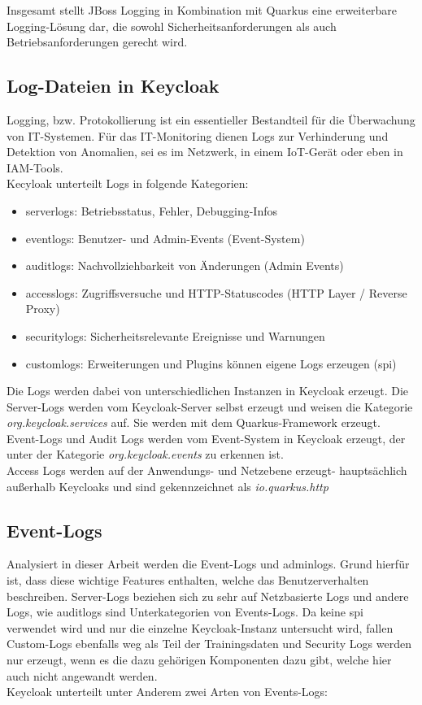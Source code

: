 \documentclass[a4paper,12pt]{article}
\begin{document}
	Insgesamt stellt JBoss Logging in Kombination mit Quarkus eine erweiterbare Logging-Lösung dar, die sowohl Sicherheitsanforderungen als auch Betriebsanforderungen gerecht wird.
	
	\subsection{Log-Dateien in Keycloak}
	Logging, bzw. Protokollierung ist ein essentieller Bestandteil für die Überwachung von IT-Systemen. Für das IT-Monitoring dienen Logs zur Verhinderung und Detektion von Anomalien, sei es im Netzwerk, in einem IoT-Gerät oder eben in IAM-Tools. 
	\\[0.5em]
	Kecyloak unterteilt Logs in folgende Kategorien:
	\begin{itemize}
		\item \gls{serverlogs}: Betriebsstatus, Fehler, Debugging-Infos
		\item \gls{eventlogs}: Benutzer- und Admin-Events (Event-System)
		\item \gls{auditlogs}: Nachvollziehbarkeit von Änderungen (Admin Events)
		\item \gls{accesslogs}: Zugriffsversuche und HTTP-Statuscodes (HTTP Layer / Reverse Proxy)
		\item \gls{securitylogs}: Sicherheitsrelevante Ereignisse und Warnungen
		\item \gls{customlogs}: Erweiterungen und Plugins können eigene Logs erzeugen (\gls{spi})
	\end{itemize}
	Die Logs werden dabei von unterschiedlichen Instanzen in Keycloak erzeugt. Die Server-Logs werden  vom Keycloak-Server selbst erzeugt und weisen die Kategorie \textit{org.keycloak.services} auf. Sie werden mit dem Quarkus-Framework erzeugt.
	\\[0.5em]
	Event-Logs und Audit Logs werden vom Event-System in Keycloak erzeugt, der unter der Kategorie \textit{org.keycloak.events} zu erkennen ist.
	\\[0.5em]
	Access Logs werden auf der Anwendungs- und Netzebene erzeugt- hauptsächlich außerhalb Keycloaks und sind gekennzeichnet als \textit{io.quarkus.http}
	
	\subsection{Event-Logs}
	Analysiert in dieser Arbeit werden die Event-Logs und \gls{adminlogs}. Grund hierfür ist, dass diese wichtige Features enthalten, welche das Benutzerverhalten beschreiben. Server-Logs beziehen sich zu sehr auf Netzbasierte Logs und andere Logs, wie \gls{auditlogs} sind Unterkategorien von Events-Logs. Da keine \gls{spi} verwendet wird und nur die einzelne Keycloak-Instanz untersucht wird, fallen Custom-Logs ebenfalls weg als Teil der Trainingsdaten und Security Logs werden nur erzeugt, wenn es die dazu gehörigen Komponenten dazu gibt, welche hier auch nicht angewandt werden.
	\\[0.5em]
	Keycloak unterteilt unter Anderem zwei Arten von Events-Logs:
	
\end{document}
